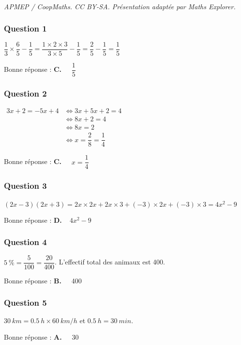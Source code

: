 \documentclass[10pt]{article}
\providecommand{\np}[2][]{{#2~#1}}
\begin{document}
\noindent\textit{APMEP / CoopMaths. CC BY-SA. Présentation adaptée par Maths Explorer.}\par\medskip
\subsubsection*{Question 1}

$\dfrac{1}{3} \times \dfrac{6}{5}-\dfrac{1}{5} =  \dfrac{1 \times 2 \times 3}{3 \times 5} - \dfrac{1}{5} = \dfrac{2}{5} - \dfrac{1}{5} = \dfrac{1}{5}$

Bonne réponse : \textbf{C.~~} $\dfrac{1}{5}$


\subsubsection*{Question 2}

$\begin{aligned}
	3 x+2= -5 x+4
	&\iff 3x + 5x + 2 = 4 \\
	&\iff  8x + 2 =  4  \\
	&\iff  8x  =  2 \\
	&\iff x = \dfrac{2}{8} = \dfrac{1}{4}
\end{aligned}$

Bonne réponse : \textbf{C.~~} $x= \dfrac{1}{4}$

\subsubsection*{Question 3}

$(2x - 3)(2x + 3) = 2x\times 2x + 2x\times 3 + (-3)\times 2x + (-3)\times 3 = 4x^2 - 9$

Bonne réponse : \textbf{D.~~}$4x^2 - 9$

\subsubsection*{Question 4}

$5~\% = \dfrac{5}{100} = \dfrac{20}{400}$. L'effectif total des animaux est 400.

Bonne réponse : \textbf{B.~~} 400

\subsubsection*{Question 5}
$\np[km]{30} = \np[h]{0.5} \times \np[km/h]{60}$ et $\np[h]{0.5} = \np[min]{30}$.

Bonne réponse : \textbf{A.~~} 30
\end{document}
